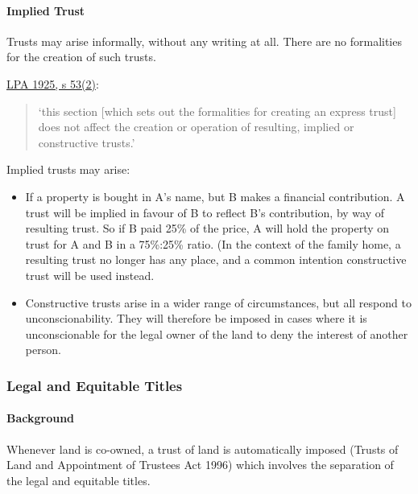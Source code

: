 \documentclass[
]{article}
\providecommand{\tightlist}{%
  \setlength{\itemsep}{0pt}\setlength{\parskip}{0pt}}
\begin{document}
\hypertarget{implied-trust}{%
\paragraph{Implied Trust}\label{implied-trust}}

Trusts may arise informally, without any writing at all. There are no
formalities for the creation of such trusts.

\href{https://www.legislation.gov.uk/ukpga/Geo5/15-16/20/section/53}{LPA
1925, s 53(2)}:

\begin{quote}
`this section {[}which sets out the formalities for creating an express
trust{]} does not affect the creation or operation of resulting, implied
or constructive trusts.'
\end{quote}

Implied trusts may arise:

\begin{itemize}
\tightlist
\item
  If a property is bought in A's name, but B makes a financial
  contribution. A trust will be implied in favour of B to reflect B's
  contribution, by way of resulting trust. So if B paid 25\% of the
  price, A will hold the property on trust for A and B in a 75\%:25\%
  ratio. (In the context of the family home, a resulting trust no longer
  has any place, and a common intention constructive trust will be used
  instead.
\item
  Constructive trusts arise in a wider range of circumstances, but all
  respond to unconscionability. They will therefore be imposed in cases
  where it is unconscionable for the legal owner of the land to deny the
  interest of another person.
\end{itemize}

\hypertarget{legal-and-equitable-titles}{%
\subsubsection{Legal and Equitable
Titles}\label{legal-and-equitable-titles}}

\hypertarget{background}{%
\paragraph{Background}\label{background}}

Whenever land is co-owned, a trust of land is automatically imposed
(Trusts of Land and Appointment of Trustees Act 1996) which involves the
separation of the legal and equitable titles.
\end{document}
